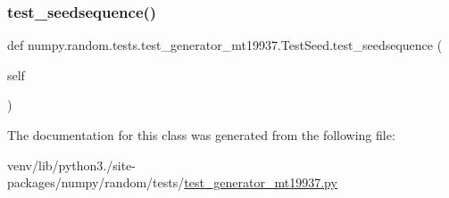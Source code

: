 \subsubsection{\texorpdfstring{test\+\_\+seedsequence()}{test\_seedsequence()}}
{\footnotesize\ttfamily def numpy.\+random.\+tests.\+test\+\_\+generator\+\_\+mt19937.\+Test\+Seed.\+test\+\_\+seedsequence (\begin{DoxyParamCaption}\item[{}]{self }\end{DoxyParamCaption})}



The documentation for this class was generated from the following file\+:\begin{DoxyCompactItemize}
\item 
venv/lib/python3./site-\/packages/numpy/random/tests/\hyperlink{test__generator__mt19937_8py}{test\+\_\+generator\+\_\+mt19937.\+py}\end{DoxyCompactItemize}
